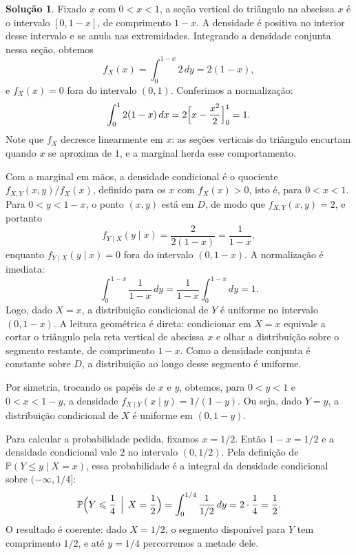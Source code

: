 \documentclass[12pt,portuguese]{article}
\theoremstyle{definition}
\theoremstyle{plainexercise}
\theoremstyle{starredexercise}
\theoremstyle{definition}
\newtheorem*{solution}{Solução}
\begin{document}
\begin{solution}
Fixado $x$ com $0 < x < 1$, a seção vertical do triângulo na abscissa $x$ é o intervalo
$[0,1-x]$, de comprimento $1-x$. A densidade é positiva no interior desse intervalo
e se anula nas extremidades. Integrando a densidade conjunta nessa seção,
obtemos
\begin{equation}\label{eq:marginal-x-uniforme-triangulo}
  f_X(x) = \int_0^{1-x} 2\,dy = 2(1-x),
\end{equation}
e $f_X(x) = 0$ fora do intervalo $(0,1)$. Conferimos a normalização:
\[
  \int_0^1 2(1-x)\,dx = 2\Bigl[x - \frac{x^2}{2}\Bigr]_0^1 = 1.
\]
Note que $f_X$ decresce linearmente em $x$: as seções verticais do triângulo encurtam quando
$x$ se aproxima de $1$, e a marginal herda esse comportamento.

Com a marginal em mãos, a densidade condicional é o quociente $f_{X,Y}(x,y)/f_X(x)$,
definido para os $x$ com $f_X(x) > 0$, isto é, para $0 < x < 1$. Para $0 < y < 1-x$, o ponto
$(x,y)$ está em $D$, de modo que $f_{X,Y}(x,y) = 2$, e portanto
\begin{equation}\label{eq:condicional-uniforme-triangulo}
  f_{Y\mid X}(y \mid x) = \frac{2}{2(1-x)} = \frac{1}{1-x},
\end{equation}
enquanto $f_{Y\mid X}(y \mid x) = 0$ fora do intervalo $(0,1-x)$. A normalização é imediata:
\[
  \int_0^{1-x} \frac{1}{1-x}\,dy = \frac{1}{1-x}\int_0^{1-x} dy = 1.
\]
Logo, dado $X = x$, a distribuição condicional de $Y$ é uniforme no intervalo $(0,1-x)$. A
leitura geométrica é direta: condicionar em $X = x$ equivale a cortar o triângulo pela reta
vertical de abscissa $x$ e olhar a distribuição sobre o segmento restante, de comprimento
$1-x$. Como a densidade conjunta é constante sobre $D$, a distribuição ao longo desse
segmento é uniforme.

Por simetria, trocando os papéis de $x$ e $y$, obtemos, para $0 < y < 1$ e $0 < x < 1-y$, a
densidade $f_{X\mid Y}(x \mid y) = 1/(1-y)$. Ou seja, dado $Y = y$, a distribuição
condicional de $X$ é uniforme em $(0,1-y)$.

Para calcular a probabilidade pedida, fixamos $x = 1/2$. Então $1-x = 1/2$ e a densidade
condicional vale $2$ no intervalo $(0,1/2)$. Pela definição de
$\mathbb{P}(Y \leqslant y \mid X = x)$, essa probabilidade é a integral da densidade
condicional sobre $(-\infty, 1/4]$:
\[
  \mathbb{P}\Bigl(Y \leqslant \frac{1}{4} \,\Bigm|\, X = \frac{1}{2}\Bigr)
  = \int_0^{1/4} \frac{1}{1/2}\,dy = 2 \cdot \frac{1}{4} = \frac{1}{2}.
\]
O resultado é coerente: dado $X = 1/2$, o segmento disponível para $Y$ tem comprimento
$1/2$, e até $y = 1/4$ percorremos a metade dele.
\end{solution}
\end{document}

